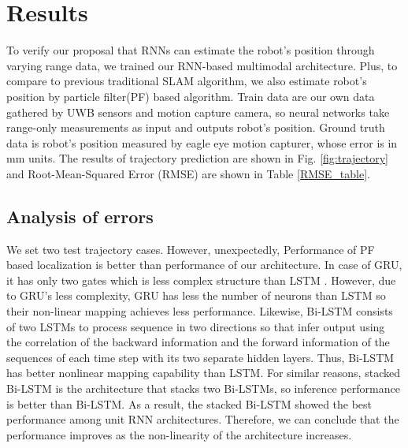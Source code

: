 \documentclass[letterpaper, 10 pt, conference]{ieeeconf}  %
\begin{document}
\section{Results}

To verify our proposal that RNNs can estimate the robot's position through varying range data, we trained our RNN-based multimodal architecture. Plus, to compare to previous traditional SLAM algorithm, we also estimate robot's position by particle filter(PF) based algorithm. Train data are our own data gathered by UWB sensors and motion capture camera, so neural networks take range-only measurements as input and outputs robot's position. Ground truth data is robot's position measured by eagle eye motion capturer, whose error is in mm units. The results of trajectory prediction are shown in Fig. \ref{fig:trajectory} and Root-Mean-Squared Error (RMSE) are shown in Table \ref{RMSE_table}.

\subsection{Analysis of errors}

 We set two test trajectory cases. However, unexpectedly, Performance of PF based localization is better than performance of our architecture. In case of GRU, it has only two gates which is less complex structure than LSTM \cite{chung2014empirical}. However, due to GRU's less complexity, GRU has less the number of neurons than LSTM so their non-linear mapping achieves less performance. Likewise, Bi-LSTM consists of two LSTMs to process sequence in two directions so that infer output using the correlation of the backward information and the forward information of the sequences of each time step with its two separate hidden layers. Thus, Bi-LSTM has better nonlinear mapping capability than LSTM. For similar reasons, stacked Bi-LSTM is the architecture that stacks two Bi-LSTMs, so inference performance is better than Bi-LSTM. As a result, the stacked Bi-LSTM showed the best performance among unit RNN architectures. Therefore, we can conclude that the performance improves as the non-linearity of the architecture increases.
 
\end{document}
